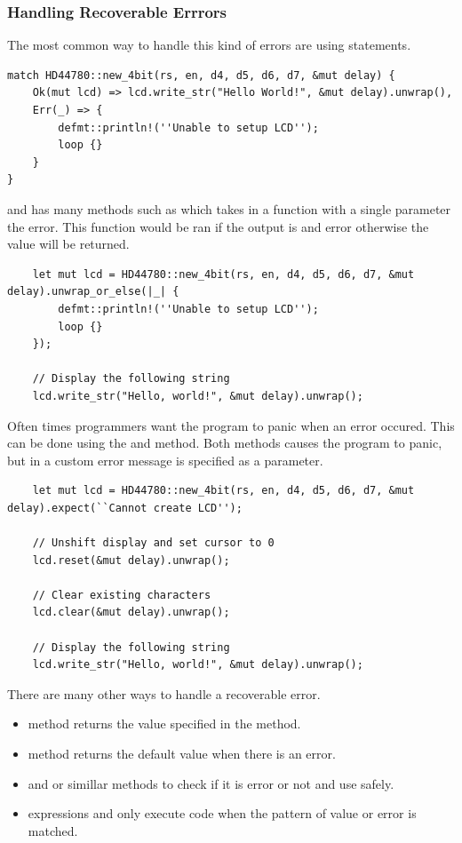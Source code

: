 \documentclass{beamer}
\begin{document}
\begin{frame}
  \frametitle[]{Handling Recoverable Errrors}
  The most common way to handle this kind of errors are using  statements.

\begin{lstlisting}
match HD44780::new_4bit(rs, en, d4, d5, d6, d7, &mut delay) {
    Ok(mut lcd) => lcd.write_str("Hello World!", &mut delay).unwrap(),
    Err(_) => {
        defmt::println!(''Unable to setup LCD'');
        loop {}
    }
}
\end{lstlisting}

\pagebreak

 and  has many methods such as  which takes in a function with a single parameter the error. This function would be ran if the output is and error otherwise the value  will be returned.

\begin{lstlisting}
    let mut lcd = HD44780::new_4bit(rs, en, d4, d5, d6, d7, &mut delay).unwrap_or_else(|_| {
        defmt::println!(''Unable to setup LCD'');
        loop {}
    });

    // Display the following string
    lcd.write_str("Hello, world!", &mut delay).unwrap();
\end{lstlisting}

\pagebreak

Often times programmers want the program to panic when an error occured. This can be done using the  and  method. Both methods causes the program to panic, but in  a custom error message is specified as a parameter.

\begin{lstlisting}
    let mut lcd = HD44780::new_4bit(rs, en, d4, d5, d6, d7, &mut delay).expect(``Cannot create LCD'');

    // Unshift display and set cursor to 0
    lcd.reset(&mut delay).unwrap();

    // Clear existing characters
    lcd.clear(&mut delay).unwrap();

    // Display the following string
    lcd.write_str("Hello, world!", &mut delay).unwrap();
\end{lstlisting}

\pagebreak

There are many other ways to handle a recoverable error.
\begin{itemize}
  \item{ method returns the value specified in the method.}
  \item{ method returns the default value when there is an error.}
  \item{ and  or simillar methods to check if it is error or not and use  safely.}
  \item{ expressions and only execute code when the pattern of value or error is matched.}
\end{itemize}
\end{frame}
\end{document}
